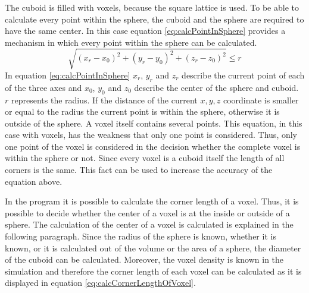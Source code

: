 The cuboid is filled with voxels, because the square lattice is used.  To be able to calculate every point within the sphere, the cuboid and the sphere are required to have the same center. In this case equation \ref{eq:calcPointInSphere} provides a mechanism in which every point within the sphere can be calculated.
\begin{equation}\label{eq:calcPointInSphere}
\sqrt{(x_{r}-x_{0})^2 + (y_{r}-y_{0})^2 + (z_{r}-z_{0})^2} \leq r
\end{equation}
In equation \ref{eq:calcPointInSphere} $x_{r}$, $y_{r}$ and $z_{r}$ describe the current point of each of the three axes and $x_{0}$, $y_{0}$ and $z_{0}$ describe the center of the sphere and cuboid. $r$ represents the radius. If the distance of the current $x, y, z$ coordinate is smaller or equal to the radius the current point is within the sphere, otherwise it is outside of the sphere.
A voxel itself contains several points. This equation, in this case with voxels, has the weakness that only one point is considered. Thus, only one point of the voxel is considered in the decision whether the complete voxel is within the sphere or not. Since every voxel is a cuboid itself the length of all corners is the same. This fact can be used to increase the accuracy of the equation above.

In the program it is possible to calculate the corner length of a voxel. Thus, it is possible to decide whether the center of a voxel is at the inside or outside of a sphere. The calculation of the center of a voxel is calculated is explained in the following paragraph. \newline
Since the radius of the sphere is known, whether it is known, or it is calculated out of the volume or the area of a sphere, the diameter of the cuboid can be calculated. Moreover, the voxel density is known in the simulation and therefore the corner length of each voxel can be calculated as it is displayed in equation \ref{eq:calcCornerLengthOfVoxel}.

